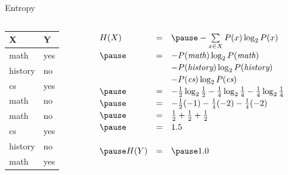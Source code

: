 \documentclass[14pt]{beamer}
\begin{document}
\begin{frame}{Entropy}
	\begin{columns}
		\begin{column}{1.1in}
			\begin{tabular}{ll}
				X       & Y   \\
				\hline
				math    & yes \\
				history & no  \\
				cs      & yes \\
				math    & no  \\
				math    & no  \\
				cs      & yes \\
				history & no  \\
				math    & yes \\
			\end{tabular}
		\end{column}
		\begin{column}{3.1in}
			\pause
			$
			\extrarowheight=2pt
			\begin{array}{lll}
				H(X)        & = & \pause -\sum\limits_{x \in X}P(x)\log_2 P(x) \\
				     \pause & = & -P(\textit{math})\log_2 P(\textit{math}) \\
				            &   & -P(\textit{history})\log_2 P(\textit{history}) \\
				            &   & -P(\textit{cs})\log_2 P(\textit{cs}) \\
				     \pause & = & -\frac{1}{2}\log_2\frac{1}{2} 
				                  -\frac{1}{4}\log_2\frac{1}{4}
				                  -\frac{1}{4}\log_2\frac{1}{4} \\
				     \pause & = & -\frac{1}{2}(-1) - \frac{1}{4}(-2) - \frac{1}{4}(-2) \\
				     \pause & = & \frac{1}{2} + \frac{1}{2} + \frac{1}{2} \\
				     \pause & = & 1.5 \\
				\\
				\pause
				H(Y)        & = & \pause 1.0 \\
			\end{array}
			$
		\end{column}
	\end{columns}
\end{frame}
\end{document}
